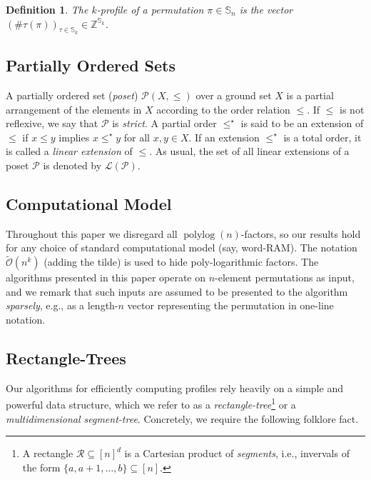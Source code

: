 \documentclass{article}
\newtheorem{definition}[theorem]{Definition}
\newcommand{\Sn}{\mathbb{S}_n}
\newcommand{\ZZ}{\mathbb{Z}}
\newcommand{\pc}[2]{{\# \mathtt{ #1 } \left( #2 \right)}}
\DeclareMathOperator{\polylog}{polylog}
\theoremstyle{remark}
\newcommand{\Otilde}[1]{\widetilde{\mathcal{O}}\left( #1 \right)}
\theoremstyle{plain}
\begin{document}
\begin{definition}
    The \emph{$k$-profile} of a permutation $\pi \in \Sn$ is the vector
    $\left( \pc{\tau}{\pi} \right)_{\tau \in \mathbb{S}_k} \in \ZZ^{\mathbb{S}_k}$.
\end{definition}

\subsection{Partially Ordered Sets}

A partially ordered set (\emph{poset}) $\mathcal{P}(X, \le)$ over a ground set $X$
is a partial arrangement of the elements in $X$ according to the order relation $\le$.
If $\le$ is not reflexive, we say that $\mathcal{P}$ is \emph{strict}.
A partial order $\le^\star$ is said to be an extension
of $\le$ if $x\le y$ implies $x\le^\star y$ for all $x,y\in X$. If an extension $\le^\star$ is a total order, it is called a \emph{linear extension} of $\le$. As usual, the set of all linear extensions of a poset $\mathcal{P}$
is denoted by $\mathcal{L}(\mathcal{P})$.

\subsection{Computational Model}

Throughout this paper we disregard all $\polylog(n)$-factors, so our results hold for any choice of standard computational model (say, word-RAM). The notation $\Otilde{n^k}$ (adding the tilde) is used to hide poly-logarithmic factors. The algorithms presented in this paper operate on $n$-element permutations as input, and we remark that such inputs are assumed to be presented to the algorithm \textit{sparsely}, e.g., as a length-$n$ vector representing the permutation in one-line notation. 

\subsection{Rectangle-Trees}
\label{subsect:rect_tree}
Our algorithms for efficiently computing profiles rely heavily on a simple and powerful data structure, which we refer to as a \emph{rectangle-tree}\footnote{
    A rectangle $\mathcal{R} \subseteq [n]^d$ is a Cartesian product of \textit{segments}, i.e., invervals of the form $\{a, a+1, \dots, b\} \subseteq [n]$.  
} or a \emph{multidimensional segment-tree}. Concretely, we require the following folklore fact. 
\end{document}
